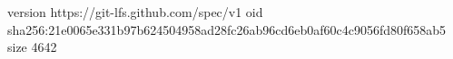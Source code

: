 version https://git-lfs.github.com/spec/v1
oid sha256:21e0065e331b97b624504958ad28fc26ab96cd6eb0af60c4c9056fd80f658ab5
size 4642
